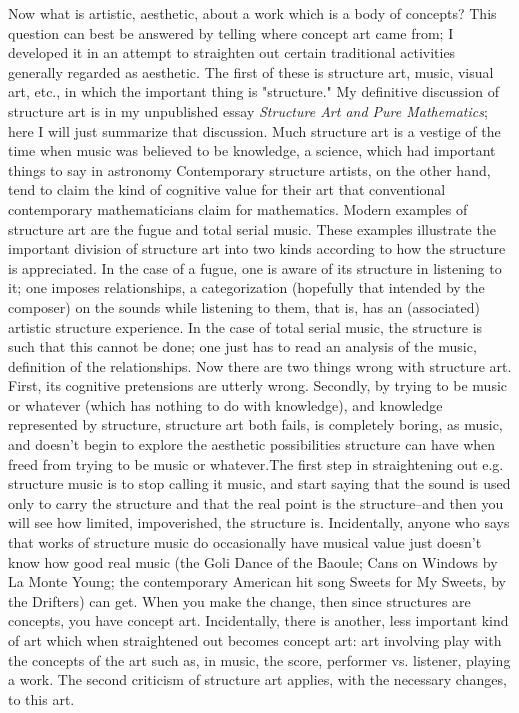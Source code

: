\documentclass[10pt,twoside,draft]{memoir}
\newcommand{\essaytitle}[1]{
	\emph{#1}}
\begin{document}
{{Now what is artistic, aesthetic, about a work which is a body of 
concepts? This question can best be answered by telling where concept art 
came from; I developed it in an attempt to straighten out certain traditional 
activities generally regarded as aesthetic. The first of these is structure art, 
music, visual art, etc., in which the important thing is "structure." My 
definitive discussion of structure art is in my unpublished essay \essaytitle{Structure 
Art and Pure Mathematics}; here I will just summarize that discussion. Much 
structure art is a vestige of the time when \eg music was believed to be 
knowledge, a science, which had important things to say in astronomy \etc
Contemporary structure artists, on the other hand, tend to claim the kind of 
cognitive value for their art that conventional contemporary mathematicians 
claim for mathematics. Modern examples of structure art are the fugue and 
total serial music. These examples illustrate the important division of 
structure art into two kinds according to how the structure is appreciated. In 
the case of a fugue, one is aware of its structure in listening to it; one 
imposes relationships, a categorization (hopefully that intended by the 
composer) on the sounds while listening to them, that is, has an (associated) 
artistic structure experience. In the case of total serial music, the structure is 
such that this cannot be done; one just has to read an analysis of the 
music, definition of the relationships. Now there are two things wrong with 
structure art. First, its cognitive pretensions are utterly wrong. Secondly, by 
trying to be music or whatever (which has nothing to do with knowledge), 
and knowledge represented by structure, structure art both fails, is 
completely boring, as music, and doesn't begin to explore the aesthetic 
possibilities structure can have when freed from trying to be music or 
whatever.The first step in straightening out e.g. structure music is to stop 
calling it music, and start saying that the sound is used only to carry the 
structure and that the real point is the structure--and then you will see how 
limited, impoverished, the structure is. Incidentally, anyone who says that 
works of structure music do occasionally have musical value just doesn't 
know how good real music (the Goli Dance of the Baoule; Cans on Windows 
by La Monte Young; the contemporary American hit song Sweets for My 
Sweets, by the Drifters) can get. When you make the change, then since 
structures are concepts, you have concept art. Incidentally, there is another, 
less important kind of art which when straightened out becomes concept art: 
art involving play with the concepts of the art such as, in music, the score, 
performer vs. listener, playing a work. The second criticism of structure art 
applies, with the necessary changes, to this art. 

}}
\end{document}
